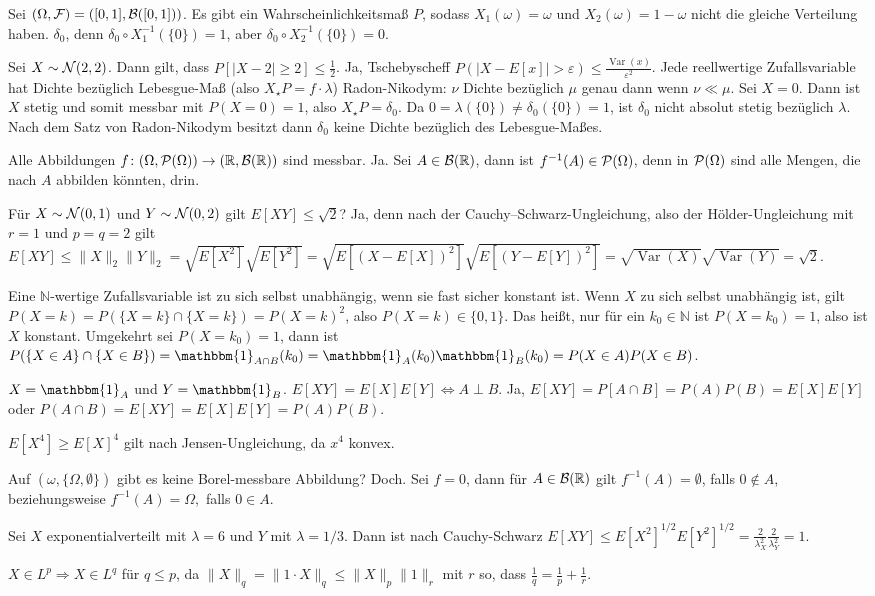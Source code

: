 \documentclass{article}
\begin{document}
Sei $(\Omega,{\cal F})=([0,1],{\cal B}([0,1]))$.
Es gibt ein Wahrscheinlichkeitsmaß $P$, sodass $X_1(\omega)=\omega$ und $X_2(\omega)=1-\omega$ nicht die gleiche Verteilung haben.
$\delta_0$, denn $\delta_0\circ X_1^{-1}(\{0\})=1$, aber $\delta_0\circ X_2^{-1}(\{0\})=0$.

Sei $X\sim{\cal N}(2,2)$. Dann gilt, dass $P[|X-2|\geq2]\leq\frac{1}{2}$.
Ja, Tschebyscheff $P(|X-E[x]|>\varepsilon)\leq\frac{\operatorname{Var}(x)}{\varepsilon^2}$.
Jede reellwertige Zufallsvariable hat Dichte bezüglich Lebesgue-Maß (also $X_\star P=f\cdot\lambda$)
Radon-Nikodym: $\nu$ Dichte bezüglich $\mu$ genau dann wenn $\nu\ll \mu$.
Sei $X=0$.
Dann ist $X$ stetig und somit messbar mit $P(X=0)=1$, also $X_\star P=\delta_0$.
Da $0=\lambda(\{0\})\neq\delta_0(\{0\})=1$, ist $\delta_0$ nicht absolut stetig bezüglich $\lambda$.
Nach dem Satz von Radon-Nikodym besitzt dann $\delta_0$ keine Dichte bezüglich des Lebesgue-Maßes.

Alle Abbildungen $f\colon (\Omega,{\cal P}(\Omega))\to(\mathbb{R},{\cal B}(\mathbb{R}))$ sind messbar.
Ja.
Sei $A\in{\cal B}(\mathbb{R})$, dann ist $f^{-1}(A)\in{\cal P}(\Omega)$, denn in ${\cal P}(\Omega)$ sind alle Mengen, die nach $A$ abbilden könnten, drin.

Für $X\sim{\cal N}(0,1)$ und $Y\sim{\cal N}(0,2)$ gilt $E[XY]\leq\sqrt{2}$?
Ja, denn nach der Cauchy--Schwarz-Ungleichung, also der Hölder-Ungleichung mit $r=1$ und $p=q=2$ gilt
$E[XY]
\leq\|X\|_2\|Y\|_2
=\sqrt{E[X^2]}\sqrt{E[Y^2]}
=\sqrt{E[(X-E[X])^2]}\sqrt{E[(Y-E[Y])^2]}
=\sqrt{\operatorname{Var}(X)}\sqrt{\operatorname{Var}(Y)}
=\sqrt{2}$.

Eine $\mathbb{N}$-wertige Zufallsvariable ist zu sich selbst unabhängig, wenn sie fast sicher konstant ist.
Wenn $X$ zu sich selbst unabhängig ist, gilt $P(X=k)=P(\{X=k\}\cap\{X=k\})=P(X=k)^2$, also $P(X=k)\in\{0,1\}$.
Das heißt, nur für ein $k_0\in\mathbb{N}$ ist $P(X=k_0)=1$, also ist $X$ konstant.
Umgekehrt sei $P(X=k_0)=1$, dann ist $P(\{X\in A\}\cap\{X\in B\})=\mathbbm{1}_{A\cap B}(k_0)=\mathbbm{1}_{A}(k_0)\mathbbm{1}_{B}(k_0)=P(X\in A)P(X\in B)$.

$X=\mathbbm{1}_A$ und $Y=\mathbbm{1}_B$.
$E[XY]=E[X]E[Y]\iff A\perp B$.
Ja, $E[XY]=P[A\cap B]=P(A)P(B)=E[X]E[Y]$ oder $P(A\cap B)=E[XY]=E[X]E[Y]=P(A)P(B)$.

$E[X^4]\geq E[X]^4$ gilt nach Jensen-Ungleichung, da $x^4$ konvex.

Auf $(\omega,\{\Omega,\emptyset\})$ gibt es keine Borel-messbare Abbildung?
Doch.
Sei $f=0$, dann für $A\in{\cal B}(\mathbb{R})$ gilt $f^{-1}(A)=\emptyset$, falls $0\notin A$, beziehungsweise $f^{-1}(A)=\Omega,$ falls $0\in A$.

Sei $X$ exponentialverteilt mit $\lambda=6$ und $Y$ mit $\lambda=1/3$. Dann ist nach Cauchy-Schwarz $E[XY]\leq E[X^2]^{1/2}E[Y^2]^{1/2}=\frac{2}{\lambda_X^2}\frac{2}{\lambda_Y^2}=1$.

$X\in L^p\Rightarrow X\in L^q$ für $q\leq p$, da $\|X\|_q=\|1\cdot X\|_q\leq\|X\|_p\|1\|_r$ mit $r$ so, dass $\frac{1}{q}=\frac{1}{p}+\frac{1}{r}$.

\end{document}
